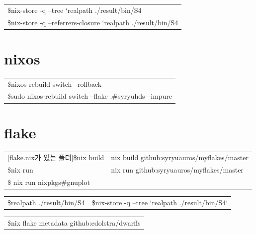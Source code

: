 \documentclass[a4paper,11pt]{article}
\begin{document}
\begin{center}
\begin{tabular}{l}
\$nix-store -q --tree `realpath ./result/bin/S4\\
\$nix-store -q --referrers-closure `realpath ./result/bin/S4\\
\end{tabular}
\end{center}

\section*{nixos}
\label{sec:orgcbe839e}
\begin{center}
\begin{tabular}{l}
\$nixos-rebuild switch --rollback\\
[flake.nix가 있는 폴더]\$sudo nixos-rebuild switch --flake .\#syryuhds --impure\\
\end{tabular}
\end{center}

\section*{flake}
\label{sec:orgf5e5df6}
\begin{center}
\begin{tabular}{ll}
[flake.nix가 있는 폴더]\$nix build & nix build  github:syryuauros/myflakes/master\\
[flake.nix가 있는 폴더]\$nix run & nix run  github:syryuauros/myflakes/master\\
\$ nix run nixpkgs\#gnuplot\\
\end{tabular}
\end{center}

\begin{center}
\begin{tabular}{ll}
\$realpath ./result/bin/S4 & \$nix-store -q --tree `realpath ./result/bin/S4`\\
\end{tabular}
\end{center}

\begin{center}
\begin{tabular}{l}
\$nix flake metadata github:edolstra/dwarffs\\
\end{tabular}
\end{center}
\end{document}
